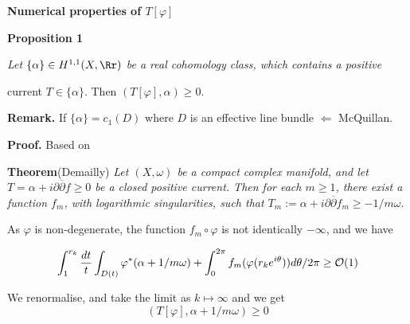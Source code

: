 \begin{slide}
\par\vspace{\bigskipamount}\noindent
{\large\bf Numerical properties of $T[\varphi]$}
\par\vspace{\bigskipamount}\noindent

{\bf Proposition 1} {\sl Let $\{\alpha\}\in H^{1, 1}(X, \Rr)$ be a real cohomology class, 
which contains a positive 

\hskip 2.5cm current $T\in \{\alpha\}$. Then $(T[\varphi], \alpha)\geq 0.$}
\par\vspace{\bigskipamount}\noindent
{\bf Remark.} If $\{\alpha\}= c_1(D)$ where $D$ is an effective line bundle \hskip 0.3cm
$\Longleftarrow$ \hskip 0.3cm McQuillan.
\par\vspace{\bigskipamount}\noindent
{\bf Proof.} Based on

{\bf Theorem}{(Demailly)} {\sl Let $(X, \omega)$ be a compact complex manifold, 
and let $T= \alpha + i\partial\overline\partial f\geq 0$ be a 
closed positive current. Then for each $m\geq 1$, there exist
a function $f_m$, with logarithmic singularities, such that 
$T_m:= \alpha + i\partial\overline\partial f_m\geq - 1/m\omega.$}

As $\varphi$ is non-degenerate, the function $f_m\circ \varphi$ is not 
identically $-\infty$, and we have

$$\int_1^{r_k}{{dt}\over {t}}\int_{D(t)}\varphi^*(\alpha+ 1/m\omega )
+ \int_0^{2\pi} f_m(\varphi(r_ke^{i\theta}))d\theta/2\pi \geq {\cal O}(1)$$

\noindent We renormalise, and take the limit as $k\mapsto\infty$
and we get 
$$(T[\varphi], \alpha+ 1/m\omega)\geq 0$$ 

\end{slide}

